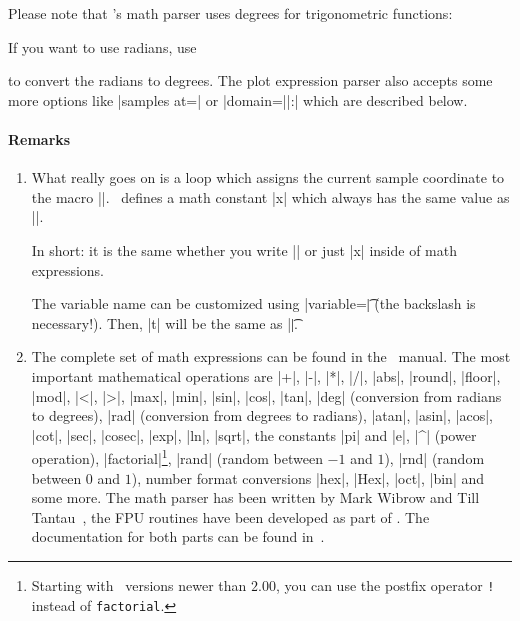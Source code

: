 {\begin{addplotoperation}[]{}{}
Please note that \PGF's math parser uses degrees for trigonometric functions:
\begin{codeexample}[]
\end{codeexample}
\noindent If you want to use radians, use 
\begin{codeexample}[]
\end{codeexample}
\noindent to convert the radians to degrees. The plot expression parser also accepts some more options like |samples at=| or |domain=||:| which are described below.

\paragraph{Remarks}
\begin{enumerate} 
	\item What really goes on is a loop which assigns the current sample coordinate to the macro |\x|. \PGFPlots\ defines a math constant |x| which always has the same value as |\x|.

	In short: it is the same whether you write |\x| or just |x| inside of math expressions.

	The variable name can be customized using |variable=\t| (the backslash is necessary!). Then, |t| will be the same as |\t|.
%

	\item The complete set of math expressions can be found in the \PGF\ manual. The most important mathematical operations are
	|+|, |-|, |*|, |/|, |abs|, |round|, |floor|, |mod|, |<|, |>|, |max|, |min|, |sin|, |cos|, |tan|, |deg| (conversion from radians to degrees), |rad| (conversion from degrees to radians), |atan|, |asin|, |acos|, |cot|, |sec|, |cosec|, |exp|, |ln|, |sqrt|, the constants |pi| and |e|, |^| (power operation), |factorial|\footnote{Starting with \PGF\ versions newer than $2.00$, you can use the postfix operator \texttt{!} instead of \texttt{factorial}.}, |rand| (random between $-1$ and $1$), |rnd| (random between $0$ and $1$), number format conversions |hex|, |Hex|, |oct|, |bin| and some more. The math parser has been written by Mark Wibrow and Till Tantau~\cite{tikz}, the FPU routines have been developed as part of \PGFPlots. The documentation for both parts can be found in~\cite{tikz}.
	

\end{enumerate}
\end{addplotoperation}}
